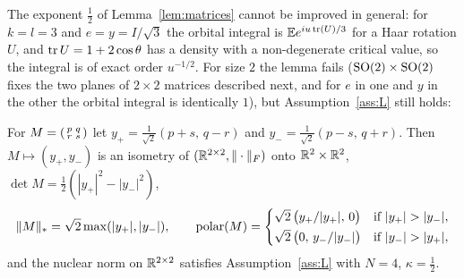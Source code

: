 The exponent $\frac12$ of Lemma~\ref{lem:matrices} cannot be improved in general: for $k=l=3$ and $e=y=I/\sqrt3$ the
orbital integral is $\mathbb{E} e^{iu\operatorname{tr}(U)/3}$ for a Haar rotation $U$, and $\operatorname{tr} U=1+2\cos\theta$ has a density with a
non-degenerate critical value, so the integral is of exact order $u^{-1/2}$. For size $2$ the lemma fails
($\mathrm{SO}(2)\times\mathrm{SO}(2)$ fixes the two planes of $2\times2$ matrices described next, and for $e$ in one and $y$ in the other the
orbital integral is identically $1$), but Assumption~\ref{ass:L} still holds:

\begin{lemma}\label{lem:twobytwo}
For $M=\begin{psmallmatrix}p&q\\r&s\end{psmallmatrix}$ let $y_+=\frac1{\sqrt2}(p+s,\,q-r)$ and
$y_-=\frac1{\sqrt2}(p-s,\,q+r)$. Then $M\mapsto(y_+,y_-)$ is an isometry of $(\mathbb{R}^{2\times2},\|\cdot\|_{F})$ onto
$\mathbb{R}^2\times\mathbb{R}^2$, $\det M=\frac12(|y_+|^2-|y_-|^2)$,
\[
\nnuc M=\sqrt2\max(|y_+|,|y_-|),\qquad
\polar(M)=\begin{cases}\sqrt2\,\big(y_+/|y_+|,\,0\big)&\text{if }|y_+|>|y_-|,\\[2pt]
\sqrt2\,\big(0,\,y_-/|y_-|\big)&\text{if }|y_-|>|y_+|,\end{cases}
\]
and the nuclear norm on $\mathbb{R}^{2\times2}$ satisfies Assumption~\ref{ass:L} with $N=4$, $\kappa=\frac12$.
\end{lemma}
